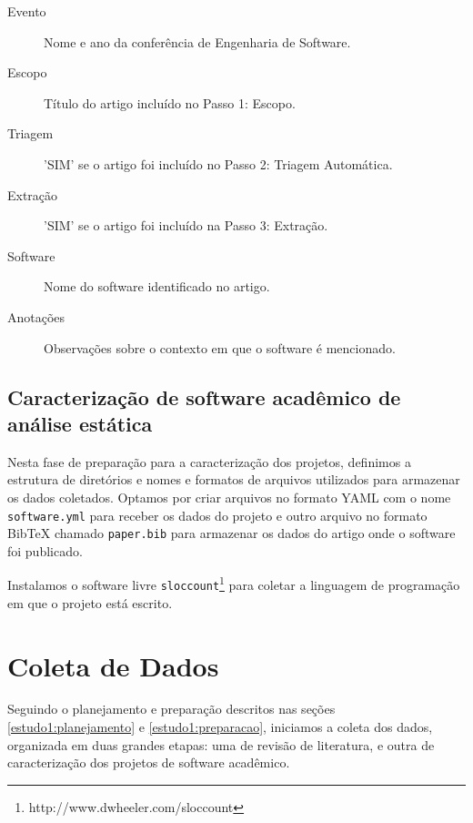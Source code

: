\begin{description}
\begin{description}
  \item[Evento] Nome e ano da conferência de Engenharia de Software.
  \item[Escopo] Título do artigo incluído no Passo 1: Escopo.
  \item[Triagem] 'SIM' se o artigo foi incluído no Passo 2: Triagem Automática.
  \item[Extração] 'SIM' se o artigo foi incluído na Passo 3: Extração.
  \item[Software] Nome do software identificado no artigo.
  \item[Anotações] Observações sobre o contexto em que o software é mencionado.
\end{description}

\end{description}

\subsection{Caracterização de software acadêmico de análise estática}


Nesta fase de preparação para a caracterização dos projetos, definimos a
estrutura de diretórios e nomes e formatos de arquivos utilizados para
armazenar os dados coletados. Optamos por criar arquivos no formato YAML com o
nome \texttt{software.yml} para receber os dados do projeto e outro arquivo no
formato BibTeX chamado \texttt{paper.bib} para armazenar os dados do artigo
onde o software foi publicado.

Instalamos o software livre
\texttt{sloccount}\footnote{http://www.dwheeler.com/sloccount} para coletar a
linguagem de programação em que o projeto está escrito.


\section{Coleta de Dados} \label{estudo1:coleta} %

Seguindo o planejamento e preparação descritos nas seções
\ref{estudo1:planejamento} e \ref{estudo1:preparacao}, iniciamos a coleta dos
dados, organizada em duas grandes etapas: uma de revisão de literatura, e outra
de caracterização dos projetos de software acadêmico.


